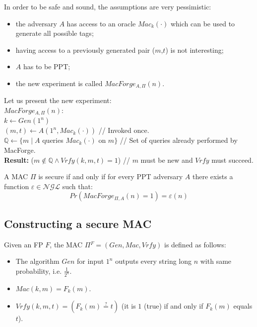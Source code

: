 \documentclass[../main]{subfiles}
\begin{document}
\noindent
In order to be safe and sound, the assumptions are very pessimistic:
\begin{itemize}
    \item the adversary $A$ has access to an oracle $Mac_k(\cdot)$ which can be used to generate all possible tags;
    \item having access to a previously generated pair ($m$,$t$) is not interesting;
    \item $A$ has to be PPT;
    \item the new experiment is called $MacForge_{A,\Pi}(n)$.
\end{itemize}

\noindent
Let us present the new experiment:\\
$MacForge_{A,\Pi}(n):$\\
$k \leftarrow{} Gen(1^n)$\\
$(m,t) \leftarrow{} A(1^n,Mac_k(\cdot))$ // Invoked once.\\
$\mathbb{Q} \leftarrow{} \{m \; | \; A$ queries $Mac_k(\cdot)$ on $m\}$ // Set of queries already performed by MacForge.\\
\textbf{Result:} ($m \notin{\mathbb{Q}} \wedge{} Vrfy(k,m,t) = 1$) // $m$ must be new and $Vrfy$ must succeed.

\begin{definition}
    A MAC $\Pi$ is secure if and only if for every PPT adversary $A$ there exists a function $\varepsilon{} \in{} \mathcal{NGL}$ such that:
    $$Pr(MacForge_{\Pi,A}(n) = 1) = \varepsilon(n)$$
\end{definition}
\subsection{Constructing a secure MAC}
\begin{definition}
    Given an FP $F$, the MAC $\Pi{}^F = (Gen, Mac, Vrfy)$ is defined as follows:
    \begin{itemize}
        \item The algorithm $Gen$ for input $1^n$ outputs every string long $n$ with same probability, i.e. $\frac{1}{2^n}$.
        \item $Mac(k,m) = F_k(m)$.
        \item $Vrfy(k,m,t) = (F_k(m)\stackrel{?}{=}t)$ (it is $1$ (true) if and only if $F_k(m)$ equals $t$).
    \end{itemize}
\end{definition}
\end{document}
